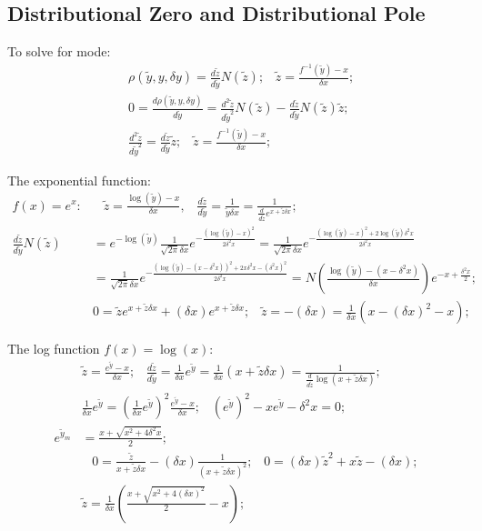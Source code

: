 \documentclass[twoside]{article}
\numberwithin{equation}{section}
\newcommand{\eqspace}{\;\;\;}
\begin{document}
\fi


\subsection{Distributional Zero and Distributional Pole}

\iffalse

To solve for mode:
\begin{align*}
& \rho(\tilde{y}, y, \delta y) = \frac{d \tilde{z}}{d \tilde{y}} N(\tilde{z});
\eqspace \tilde{z} = \frac{f^{-1}(\tilde{y}) - x}{\delta x}; \\
& 0 = \frac{d \rho(\tilde{y}, y, \delta y)}{d \tilde{y}} = \frac{d^2 \tilde{z}}{d \tilde{y}^2} N(\tilde{z}) - \frac{d \tilde{z}}{d \tilde{y}} N(\tilde{z}) \tilde{z}; \\
& \frac{d^2 \tilde{z}}{d \tilde{y}^2} = \frac{d \tilde{z}}{d \tilde{y}} \tilde{z}; \eqspace \tilde{z} = \frac{f^{-1}(\tilde{y}) - x}{\delta x};
\end{align*}

The exponential function:
\begin{align*}
f(x) = e^x:& \eqspace 
\tilde{z} = \frac{\log(\tilde{y}) - x}{\delta x}, \eqspace 
\frac{d \tilde{z}}{d \tilde{y}} = \frac{1}{\tilde{y} \delta x} = \frac{1}{\frac{d}{d \tilde{z}} e^{x + \tilde{z} \delta x}}; \eqspace \\
\frac{d \tilde{z}}{d \tilde{y}} N(\tilde{z})
&= e^{-\log(\tilde{y})} \frac{1}{\sqrt{2\pi} \delta x} e^{-\frac{(\log(\tilde{y}) - x)^2}{2 \delta^2 x}}
 = \frac{1}{\sqrt{2\pi} \delta x} e^{-\frac{(\log(\tilde{y}) - x)^2 + 2 \log(\tilde{y}) \delta^2 x }{2 \delta^2 x}} \\
& = \frac{1}{\sqrt{2\pi} \delta x} e^{-\frac{(\log(\tilde{y}) - (x - \delta^2 x))^2 + 2 x \delta^2 x - (\delta^2 x)^2 }{2 \delta^2 x}}
 = N(\frac{\log(\tilde{y}) - (x - \delta^2 x)}{\delta x}) e^{-x + \frac{\delta^2 x}{2}}; \\
& 0 = \tilde{z} e^{x + \tilde{z} \delta x} + (\delta x) e^{x + \tilde{z} \delta x}; \eqspace
 \tilde{z} = -(\delta x) = \frac{1}{\delta x}(x - (\delta x)^2 - x);
\end{align*}

The log function $f(x) = \log(x)$:
\begin{align*}
& \tilde{z} = \frac{e^{\tilde{y}} - x}{\delta x}; \eqspace 
\frac{d \tilde{z}}{d \tilde{y}} = \frac{1}{\delta x} e^{\tilde{y}} = \frac{1}{\delta x} (x + \tilde{z} \delta x)
 = \frac{1}{\frac{d}{d \tilde{z}} \log(x + \tilde{z} \delta x)}; \\
& \frac{1}{\delta x} e^{\tilde{y}} = (\frac{1}{\delta x} e^{\tilde{y}})^2 \frac{e^{\tilde{y}} - x}{\delta x}; \eqspace 
(e^{\tilde{y}})^2 - x e^{\tilde{y}} - \delta^2 x = 0; \\
e^{\tilde{y}_m} &= \frac{x + \sqrt{x^2 + 4 \delta^2 x}}{2}; \\
& \eqspace 0 = \frac{\tilde{z}}{x + \tilde{z} \delta x} - (\delta x) \frac{1}{(x + \tilde{z} \delta x)^2}; \eqspace
0 = (\delta x) \tilde{z}^2 + x \tilde{z} - (\delta x); \\
& \tilde{z} = \frac{1}{\delta x}(\frac{x + \sqrt{x^2 + 4 (\delta x)^2}}{2} - x);
\end{align*}
\end{document}
